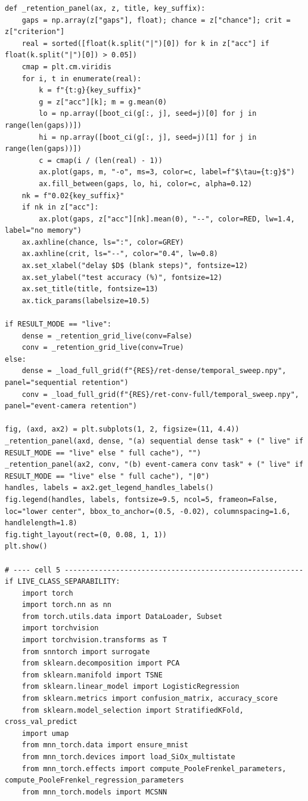 \begin{lstlisting}[caption={experiments/temporal\_storerecall.ipynb},label={lst:mnn-nb-temporal-storerecall}]
def _retention_panel(ax, z, title, key_suffix):
    gaps = np.array(z["gaps"], float); chance = z["chance"]; crit = z["criterion"]
    real = sorted([float(k.split("|")[0]) for k in z["acc"] if float(k.split("|")[0]) > 0.05])
    cmap = plt.cm.viridis
    for i, t in enumerate(real):
        k = f"{t:g}{key_suffix}"
        g = z["acc"][k]; m = g.mean(0)
        lo = np.array([boot_ci(g[:, j], seed=j)[0] for j in range(len(gaps))])
        hi = np.array([boot_ci(g[:, j], seed=j)[1] for j in range(len(gaps))])
        c = cmap(i / (len(real) - 1))
        ax.plot(gaps, m, "-o", ms=3, color=c, label=f"$\tau={t:g}$")
        ax.fill_between(gaps, lo, hi, color=c, alpha=0.12)
    nk = f"0.02{key_suffix}"
    if nk in z["acc"]:
        ax.plot(gaps, z["acc"][nk].mean(0), "--", color=RED, lw=1.4, label="no memory")
    ax.axhline(chance, ls=":", color=GREY)
    ax.axhline(crit, ls="--", color="0.4", lw=0.8)
    ax.set_xlabel("delay $D$ (blank steps)", fontsize=12)
    ax.set_ylabel("test accuracy (%)", fontsize=12)
    ax.set_title(title, fontsize=13)
    ax.tick_params(labelsize=10.5)

if RESULT_MODE == "live":
    dense = _retention_grid_live(conv=False)
    conv = _retention_grid_live(conv=True)
else:
    dense = _load_full_grid(f"{RES}/ret-dense/temporal_sweep.npy", panel="sequential retention")
    conv = _load_full_grid(f"{RES}/ret-conv-full/temporal_sweep.npy", panel="event-camera retention")

fig, (axd, ax2) = plt.subplots(1, 2, figsize=(11, 4.4))
_retention_panel(axd, dense, "(a) sequential dense task" + (" live" if RESULT_MODE == "live" else " full cache"), "")
_retention_panel(ax2, conv, "(b) event-camera conv task" + (" live" if RESULT_MODE == "live" else " full cache"), "|0")
handles, labels = ax2.get_legend_handles_labels()
fig.legend(handles, labels, fontsize=9.5, ncol=5, frameon=False, loc="lower center", bbox_to_anchor=(0.5, -0.02), columnspacing=1.6, handlelength=1.8)
fig.tight_layout(rect=(0, 0.08, 1, 1))
plt.show()

# ---- cell 5 --------------------------------------------------------
if LIVE_CLASS_SEPARABILITY:
    import torch
    import torch.nn as nn
    from torch.utils.data import DataLoader, Subset
    import torchvision
    import torchvision.transforms as T
    from snntorch import surrogate
    from sklearn.decomposition import PCA
    from sklearn.manifold import TSNE
    from sklearn.linear_model import LogisticRegression
    from sklearn.metrics import confusion_matrix, accuracy_score
    from sklearn.model_selection import StratifiedKFold, cross_val_predict
    import umap
    from mnn_torch.data import ensure_mnist
    from mnn_torch.devices import load_SiOx_multistate
    from mnn_torch.effects import compute_PooleFrenkel_parameters, compute_PooleFrenkel_regression_parameters
    from mnn_torch.models import MCSNN


\end{lstlisting}
